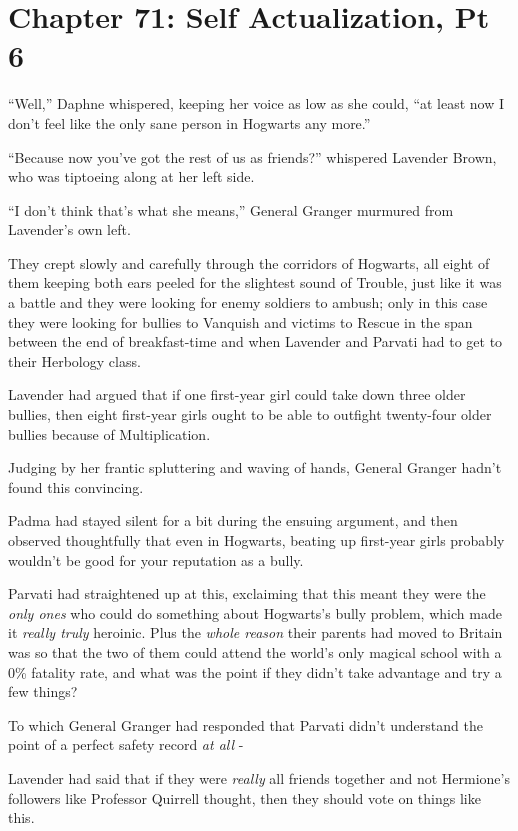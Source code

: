 \chapter{Chapter 71: Self Actualization, Pt 6}
``Well,'' Daphne whispered, keeping her voice as low as she could, ``at
least now I don't feel like the only sane person in Hogwarts any more.''

``Because now you've got the rest of us as friends?'' whispered Lavender
Brown, who was tiptoeing along at her left side.

``I don't think that's what she means,'' General Granger murmured from
Lavender's own left.

They crept slowly and carefully through the corridors of Hogwarts, all
eight of them keeping both ears peeled for the slightest sound of
Trouble, just like it was a battle and they were looking for enemy
soldiers to ambush; only in this case they were looking for bullies to
Vanquish and victims to Rescue in the span between the end of
breakfast-time and when Lavender and Parvati had to get to their
Herbology class.

Lavender had argued that if one first-year girl could take down three
older bullies, then eight first-year girls ought to be able to outfight
twenty-four older bullies because of Multiplication.

Judging by her frantic spluttering and waving of hands, General Granger
hadn't found this convincing.

Padma had stayed silent for a bit during the ensuing argument, and then
observed thoughtfully that even in Hogwarts, beating up first-year girls
probably wouldn't be good for your reputation as a bully.

Parvati had straightened up at this, exclaiming that this meant they
were the \emph{only ones} who could do something about Hogwarts's bully
problem, which made it \emph{really truly} heroinic. Plus the
\emph{whole reason} their parents had moved to Britain was so that the
two of them could attend the world's only magical school with a 0\%
fatality rate, and what was the point if they didn't take advantage and
try a few things?

To which General Granger had responded that Parvati didn't understand
the point of a perfect safety record \emph{at all} -

Lavender had said that if they were \emph{really} all friends together
and not Hermione's followers like Professor Quirrell thought, then they
should vote on things like this.

